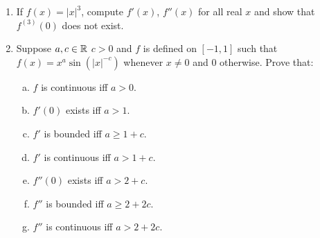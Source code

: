 \begin{enumerate}[1.]
    \begin{proof}
        $f$ is (twice) differentiable at $x$ and thus continuous. Thus the numerator tends to 0 as $h \to 0$. Applying L'Hopital's yields
        \begin{align*}
            \lim_{h \to 0} \frac{f(x + h) + f(x - h) - 2f(x)}{h^2} 
                &= \lim_{h \to 0} \frac{f'(x + h) + f'(x - h) - 2f'(x)}{2h} \\
                &= \lim_{h \to 0} \frac{f'(x + h) - f'(x)}{2h} - \frac{f'(x) - f'(x - h)}{2h} \\
                &= f''(x) 
        \end{align*}
        so we are done.
    \end{proof}
\item %
    If $f(x) = |x|^3$, compute $f'(x)$, $f''(x)$ for all real $x$ and show that $f^{(3)}(0)$ does not exist.

\item %
    Suppose $a, c \in \mathbb{R}$ $c > 0$ and $f$ is defined on $[-1, 1]$ such that $f(x) = x^a \sin(|x|^{-c})$ whenever $x \ne 0$ and $0$ otherwise.
    Prove that:
    \begin{enumerate}[(a)]
        \item $f$ is continuous iff $a > 0$.
        \item $f'(0)$ exists iff $a > 1$.
        \item $f'$ is bounded iff $a \ge 1 + c$.
        \item $f'$ is continuous iff $a > 1 + c$.
        \item $f''(0)$ exists iff $a > 2 + c$.
        \item $f''$ is bounded iff $a \ge 2 + 2c$.
        \item $f''$ is continuous iff $a > 2 + 2c$.
    \end{enumerate}


\end{enumerate}
